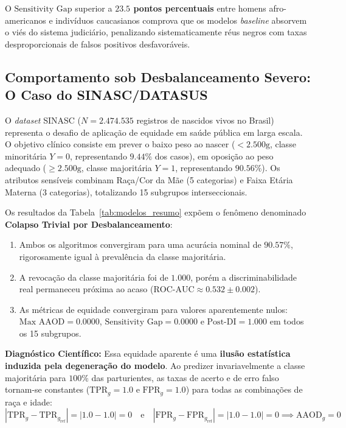 O $\text{Sensitivity Gap}$ superior a \textbf{$23.5$ pontos percentuais} entre homens afro-americanos e indivíduos caucasianos comprova que os modelos \textit{baseline} absorvem o viés do sistema judiciário, penalizando sistematicamente réus negros com taxas desproporcionais de falsos positivos desfavoráveis.

\subsection{Comportamento sob Desbalanceamento Severo: O Caso do SINASC/DATASUS}
\label{subsec:sinasc_desbalanceamento}

O \textit{dataset} SINASC ($N = 2.474.535$ registros de nascidos vivos no Brasil) representa o desafio de aplicação de equidade em saúde pública em larga escala. O objetivo clínico consiste em prever o baixo peso ao nascer ($<2.500\text{g}$, classe minoritária $Y=0$, representando $9.44\%$ dos casos), em oposição ao peso adequado ($\ge 2.500\text{g}$, classe majoritária $Y=1$, representando $90.56\%$). Os atributos sensíveis combinam Raça/Cor da Mãe (5 categorias) e Faixa Etária Materna (3 categorias), totalizando 15 subgrupos interseccionais.

Os resultados da Tabela~\ref{tab:modelos_resumo} expõem o fenômeno denominado \textbf{Colapso Trivial por Desbalanceamento}:
\begin{enumerate}
    \item Ambos os algoritmos convergiram para uma acurácia nominal de \textbf{$90.57\%$}, rigorosamente igual à prevalência da classe majoritária.
    \item A revocação da classe majoritária foi de $1.000$, porém a discriminabilidade real permaneceu próxima ao acaso ($\text{ROC-AUC} \approx 0.532 \pm 0.002$).
    \item As métricas de equidade convergiram para valores aparentemente nulos: $\text{Max AAOD} = 0.0000$, $\text{Sensitivity Gap} = 0.0000$ e $\text{Post-DI} = 1.000$ em todos os 15 subgrupos.
\end{enumerate}

\noindent\textbf{Diagnóstico Científico:} Essa equidade aparente é uma \textbf{ilusão estatística induzida pela degeneração do modelo}. Ao predizer invariavelmente a classe majoritária para $100\%$ das parturientes, as taxas de acerto e de erro falso tornam-se constantes ($\text{TPR}_g = 1.0$ e $\text{FPR}_g = 1.0$) para todas as combinações de raça e idade:
\begin{equation}
|\text{TPR}_g - \text{TPR}_{g_{\text{ref}}}| = |1.0 - 1.0| = 0 \quad \text{e} \quad |\text{FPR}_g - \text{FPR}_{g_{\text{ref}}}| = |1.0 - 1.0| = 0 \implies \text{AAOD}_g = 0
\end{equation}

